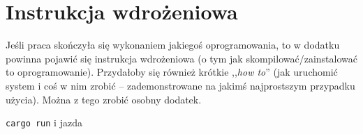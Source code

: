 \chapter{Instrukcja wdrożeniowa}
Jeśli praca skończyła się wykonaniem jakiegoś oprogramowania, to w dodatku powinna pojawić się instrukcja wdrożeniowa (o tym jak skompilować/zainstalować to oprogramowanie).
Przydałoby się również krótkie ,,\emph{how to}'' (jak uruchomić system i coś w nim zrobić -- zademonstrowane na jakimś najprostszym przypadku użycia). Można z tego zrobić osobny dodatek.

\noindent
\texttt{cargo run} i jazda
